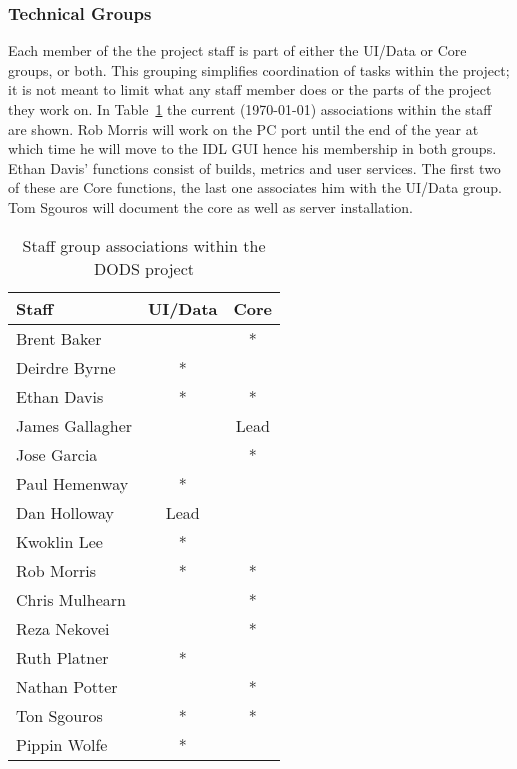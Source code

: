 \documentclass{article}
\begin{document}
\subsubsection*{Technical Groups}
Each member of the the project staff is part of either the UI/Data or Core
groups, or both. This grouping simplifies coordination of tasks within the
project; it is not meant to limit what any staff member does or the parts of
the project they work on. In Table~\ref{table:staff} the current (\today)
associations within the staff are shown. Rob Morris will work on the PC
port until the end of the year at which time he will move to the IDL 
GUI hence his membership in both groups. Ethan Davis' functions consist
of builds, metrics and user services. The first two of these are Core
functions, the last one associates him with the UI/Data group. Tom
Sgouros will document the core as well as server installation.

\begin{table}
\caption{Staff group associations within the DODS project}
\label{table:staff}
\begin{center}
\begin{tabular}{|l|c|c|} \hline
Staff           & UI/Data & Core \\ \hline
Brent Baker     &       & *     \\           
Deirdre Byrne   & *     &       \\
Ethan Davis     & *     & *     \\
James Gallagher &       & Lead  \\
Jose Garcia     &       & *     \\
Paul Hemenway   & *     &       \\
Dan Holloway    & Lead  &       \\
Kwoklin Lee     & *     &       \\
Rob Morris      & *     & *     \\
Chris Mulhearn  &       & *     \\
Reza Nekovei    &       & *     \\
Ruth Platner    & *     &       \\
Nathan Potter   &       & *     \\
Ton Sgouros     & *     & *     \\ 
Pippin Wolfe    & *     &       \\ \hline
\end{tabular}
\end{center}
\end{table}
\end{document}
